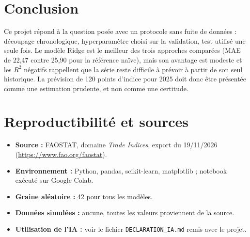 \documentclass[11pt,a4paper]{article}
\begin{document}
\section{Conclusion}

Ce projet répond à la question posée avec un protocole sans fuite de données : découpage chronologique, hyperparamètre choisi sur la validation, test utilisé une seule fois. Le modèle Ridge est le meilleur des trois approches comparées (MAE de 22,47 contre 25,90 pour la référence naïve), mais son avantage est modeste et les $R^2$ négatifs rappellent que la série reste difficile à prévoir à partir de son seul historique. La prévision de 120 points d'indice pour 2025 doit donc être présentée comme une estimation prudente, et non comme une certitude.

\section{Reproductibilité et sources}

\begin{itemize}
  \item \textbf{Source :} FAOSTAT, domaine \emph{Trade Indices}, export du 19/11/2026 (\url{https://www.fao.org/faostat}).
  \item \textbf{Environnement :} Python, pandas, scikit-learn, matplotlib ; notebook exécuté sur Google Colab.
  \item \textbf{Graine aléatoire :} 42 pour tous les modèles.
  \item \textbf{Données simulées :} aucune, toutes les valeurs proviennent de la source.
  \item \textbf{Utilisation de l'IA :} voir le fichier \texttt{DECLARATION\_IA.md} remis avec le projet.
\end{itemize}
\end{document}
